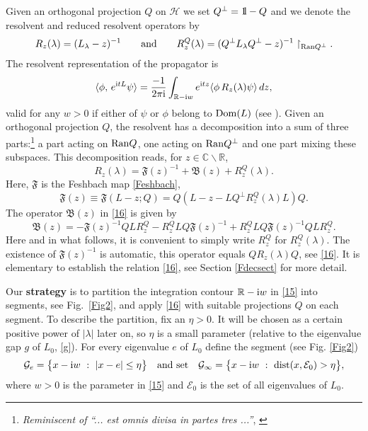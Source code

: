\documentclass[letterpaper,onecolumn,11pt,accepted=2021-12-09]{quantumarticle}
\numberwithin{equation}{section}
\renewcommand{\i}{{\rm i}}
\newcommand{\bbbone}{\mathchoice {\rm 1\mskip-4mu l} {\rm 1\mskip-4mu l}
	{\rm 1\mskip-4.5mu l} {\rm 1\mskip-5mu l}}
\begin{document}
Given an orthogonal projection $Q$ on ${\mathcal H}$ we set $Q^\perp=\bbbone-Q$  and we denote the resolvent and reduced resolvent operators by
\begin{equation} 
	R_z (\lambda)= (L_\lambda-z)^{-1} \qquad \mbox{and}\qquad R_z^Q (\lambda)= (Q^\perp L_\lambda Q^\perp -z)^{-1}\upharpoonright_{{\rm Ran}Q^\perp}.
	\label{m12}
\end{equation}
The resolvent representation of the propagator is
\begin{equation}
	\label{15}
\langle \phi ,  \, e^{\i t L} \psi\rangle =\frac{-1}{2\pi\i} \int_{{\mathbb R}-\i w} e^{\i tz}\langle \phi \, R_z(\lambda)  \psi \rangle \, dz,
\end{equation}
valid for any $w>0$ if either of $\psi$ or $\phi$ belong to ${\rm Dom}(L)$ (see \cite{EN}). Given an orthogonal projection $Q$, the resolvent has a decomposition into a sum of three parts:\footnote{{\em Reminiscent of ``... est omnis divisa in partes tres ...''}, \cite{Cesar}} a part acting on ${\rm Ran}Q$, one acting on ${\rm Ran}Q^\perp$ and one part mixing these subspaces. This decomposition reads, for $z\in{\mathbb C}\backslash{\mathbb R}$,
\begin{equation}
\label{16}
R_z(\lambda) = {\mathfrak F}(z)^{-1} +{\mathfrak B}(z) + R^Q_z(\lambda).
\end{equation}
Here, $\mathfrak F$ is the Feshbach map \eqref{Feshbach},
\begin{equation}
 {\mathfrak F}(z) \equiv {\mathfrak F}(L-z;Q)= Q(L-z - LQ^\perp R_z^Q(\lambda)L)Q.
 \label{16.4}
\end{equation}
The operator ${\mathfrak B}(z)$ in \eqref{16} is given by
\begin{equation}
\label{17}
{\mathfrak B}(z) = -{\mathfrak F}(z)^{-1} QL R_z^Q - R_z^QLQ{\mathfrak F}(z)^{-1} +R^Q_z LQ{\mathfrak F}(z)^{-1} QL R_z^Q. 
\end{equation}
Here and in what follows, it is convenient to simply write $R_z^Q$ for $R_z^Q(\lambda)$. The existence of ${\mathfrak F}(z)^{-1}$ is automatic, this operator equals $QR_z(\lambda)Q$, see \eqref{16}. It is elementary to establish the relation \eqref{16}, see Section \ref{Fdecsect} for more detail.
\medskip

Our {\bf strategy} is to partition the integration contour ${\mathbb R}-\i w$ in \eqref{15} into segments, see Fig.~\ref{Fig2}, and apply \eqref{16} with suitable projections $Q$ on each segment. To describe the partition, fix an $\eta>0$. It will be chosen as a certain positive power of  $|\lambda|$ later on, so $\eta$ is a small parameter (relative to the eigenvalue gap $g$ of $L_0$, \eqref{g}).  For every eigenvalue $e$ of $L_0$  define the segment (see Fig. \!\ref{Fig2})  
\begin{equation} 
\label{018}
{\mathcal G}_e =\big\{x-\i w\ :\ |x-e|\le \eta\big\} \quad \mbox{and set}	\quad {\mathcal G}_\infty = \big\{x-\i w\ :\ {\rm dist}(x, {\mathcal E}_0)>\eta \big\},
\end{equation}
where $w>0$ is the parameter in \eqref{15} and ${\mathcal E}_0$ is the set of all eigenvalues of $L_0$.  
\end{document}
